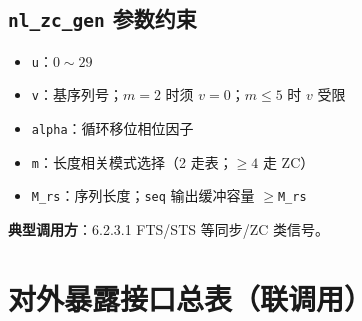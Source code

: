 \documentclass[11pt,a4paper]{ctexart}
\begin{document}
\subsection{\texttt{nl\_zc\_gen} 参数约束}

\begin{itemize}[nosep]
  \item \texttt{u}：$0\sim 29$
  \item \texttt{v}：基序列号；$m{=}2$ 时须 $v{=}0$；$m\le 5$ 时 $v$ 受限
  \item \texttt{alpha}：循环移位相位因子
  \item \texttt{m}：长度相关模式选择（2 走表；$\ge 4$ 走 ZC）
  \item \texttt{M\_rs}：序列长度；\texttt{seq} 输出缓冲容量 $\ge$\texttt{M\_rs}
\end{itemize}

\textbf{典型调用方}：6.2.3.1 FTS/STS 等同步/ZC 类信号。

\newpage
\section{对外暴露接口总表（联调用）}
\end{document}
